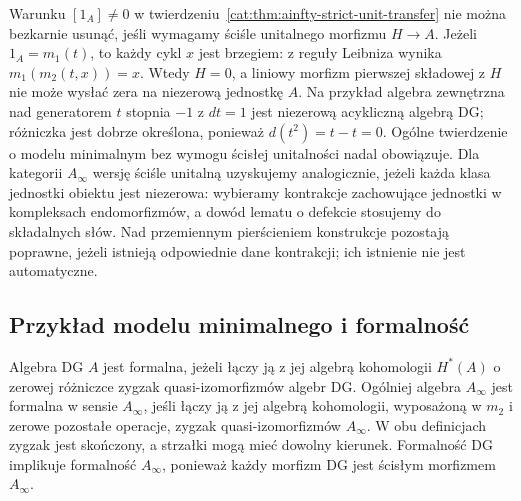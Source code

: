 \begin{uwaga}\label{cat:rem:ainfty-minimal-scope}
Warunku $[1_A]\neq0$ w twierdzeniu~\ref{cat:thm:ainfty-strict-unit-transfer} nie można bezkarnie usunąć, jeśli wymagamy ściśle unitalnego morfizmu $H\to A$. Jeżeli $1_A=m_1(t)$, to każdy cykl $x$ jest brzegiem: z reguły Leibniza wynika $m_1(m_2(t,x))=x$. Wtedy $H=0$, a liniowy morfizm pierwszej składowej z $H$ nie może wysłać zera na niezerową jednostkę $A$. Na przykład algebra zewnętrzna nad generatorem $t$ stopnia $-1$ z $dt=1$ jest niezerową acykliczną algebrą DG; różniczka jest dobrze określona, ponieważ $d(t^2)=t-t=0$. Ogólne twierdzenie o modelu minimalnym bez wymogu ścisłej unitalności nadal obowiązuje. Dla kategorii $A_\infty$ wersję ściśle unitalną uzyskujemy analogicznie, jeżeli każda klasa jednostki obiektu jest niezerowa: wybieramy kontrakcje zachowujące jednostki w kompleksach endomorfizmów, a dowód lematu o defekcie stosujemy do składalnych słów. Nad przemiennym pierścieniem konstrukcje pozostają poprawne, jeżeli istnieją odpowiednie dane kontrakcji; ich istnienie nie jest automatyczne.
\end{uwaga}

\subsection{Przykład modelu minimalnego i formalność}

\begin{definicja}\label{cat:def:dg-formality}
Algebra DG $A$ jest formalna, jeżeli łączy ją z jej algebrą kohomologii $H^*(A)$ o zerowej różniczce zygzak quasi-izomorfizmów algebr DG. Ogólniej algebra $A_\infty$ jest formalna w sensie $A_\infty$, jeśli łączy ją z jej algebrą kohomologii, wyposażoną w $m_2$ i zerowe pozostałe operacje, zygzak quasi-izomorfizmów $A_\infty$. W obu definicjach zygzak jest skończony, a strzałki mogą mieć dowolny kierunek. Formalność DG implikuje formalność $A_\infty$, ponieważ każdy morfizm DG jest ścisłym morfizmem $A_\infty$.
\end{definicja}

